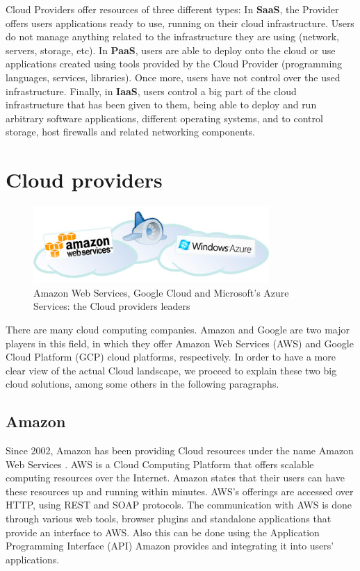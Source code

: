 Cloud Providers offer resources of three different types: In \textbf{SaaS}, the Provider offers users applications ready to use, running on their cloud infrastructure. Users do not manage anything related to the infrastructure they are using (network, servers, storage, etc). In \textbf{PaaS}, users are able to deploy onto the cloud or use applications created using tools provided by the Cloud Provider (programming languages, services, libraries). Once more, users have not control over the used infrastructure. Finally, in \textbf{IaaS}, users control a big part of the cloud infrastructure that has been given to them, being able to deploy and run arbitrary software applications, different operating systems, and to control storage, host firewalls and related networking components.



\section{Cloud providers}

\begin{figure}[htb]
\centering
\includegraphics[width=0.8\textwidth]{./images/clouds.jpg}
\caption{Amazon Web Services, Google Cloud and Microsoft's Azure Services: the Cloud providers leaders} \label{fig:bigData}
\end{figure}


There are many cloud computing companies. Amazon and Google are two major players in this field, in which they offer Amazon Web Services (AWS) and Google Cloud Platform (GCP) cloud platforms, respectively. In order to have a more clear view of the actual Cloud landscape, we proceed to explain these two big cloud solutions, among some others in the following paragraphs.

\subsection{Amazon}
Since 2002, Amazon has been providing Cloud resources under the name Amazon Web Services \cite{amazon:aws}. AWS is a Cloud Computing Platform that offers scalable computing resources over the Internet. Amazon states that their users can have these resources up and running within minutes. AWS's offerings are accessed over HTTP, using REST and SOAP protocols. The communication with AWS is done through various web tools, browser plugins and standalone applications that provide an interface to AWS. Also this can be done using the Application Programming Interface (API) Amazon provides and integrating it into users' applications.

